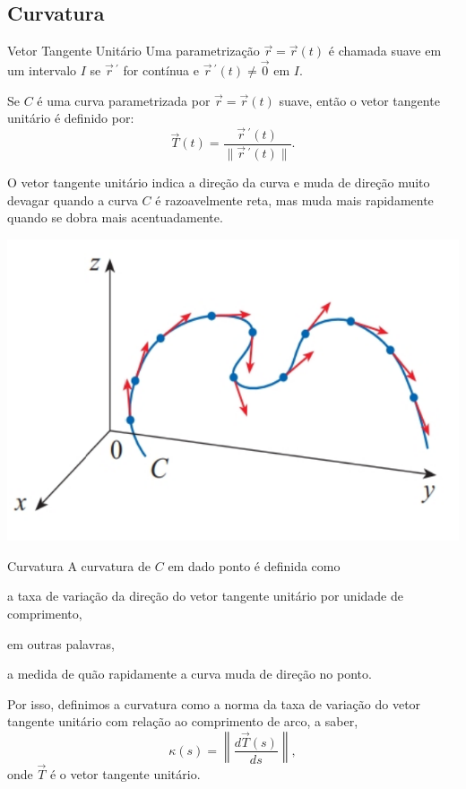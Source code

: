 \subsection*{Curvatura}
\begin{frame}[label=fun-vet]{Vetor Tangente Unitário}
Uma parametrização {\color{red} $\vec{r}=\vec{r}(t)$} é chamada {\color{blue} suave} em um intervalo $I$ se {\color{red}$\vec{r}\,^\prime$} for contínua e {\color{red}$\vec{r}\,^\prime(t)\neq \vec{0}$} em $I$.
\medskip

Se $C$ é uma curva parametrizada por $\vec{r}=\vec{r}(t)$ suave, então o {\color{blue}vetor tangente unitário} é definido por:
\[\vec{T}(t)=\frac{\vec{r}\,^\prime(t)}{\|\vec{r}\,^\prime(t)\|}.\]


\begin{minipage}{0.5\textwidth}
O vetor tangente unitário indica a direção da curva e muda de direção muito devagar quando a curva $C$ é razoavelmente reta, mas muda mais rapidamente quando se dobra mais acentuadamente.
\end{minipage}
\begin{minipage}{0.4\textwidth}
\begin{center}
\includegraphics[scale=0.35]{figuras/vetor-tangente.png}
\end{center}
\end{minipage}

\end{frame}


\begin{frame}[label=fun-vet]{Curvatura}
A {\color{blue}curvatura} de $C$ em dado ponto é definida como 

\begin{center}
{\color{red}a taxa de variação da direção do vetor tangente unitário por unidade de comprimento,}
\end{center}
em outras palavras,
\begin{center}
{\color{red} a medida de quão rapidamente a curva muda de direção no ponto}.
\end{center} 

Por isso, definimos a curvatura como a norma  da taxa de variação do vetor tangente unitário com relação ao comprimento de arco, a saber, 
\[
\kappa(s)=\left\|\frac{d\vec{T}(s)}{ds}\right\|,
\]
onde $\vec{T}$ é o vetor tangente unitário.
\end{frame}


